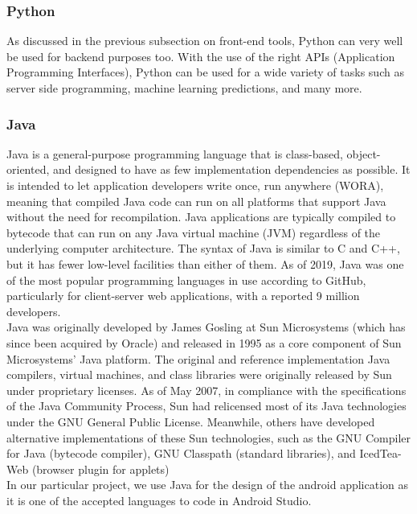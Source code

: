 \documentclass[14pt]{report}
\begin{document}
				\subsubsection{Python}
					As discussed in the previous subsection on front-end tools, Python can very well be used for backend purposes too. With the use of the right APIs (Application Programming Interfaces), Python can be used for a wide variety of tasks such as server side programming, machine learning predictions, and many more.
				
				\subsubsection{Java}
					Java is a general-purpose programming language that is class-based, object-oriented, and designed to have as few implementation dependencies as possible. It is intended to let application developers write once, run anywhere (WORA), meaning that compiled Java code can run on all platforms that support Java without the need for recompilation. Java applications are typically compiled to bytecode that can run on any Java virtual machine (JVM) regardless of the underlying computer architecture. The syntax of Java is similar to C and C++, but it has fewer low-level facilities than either of them. As of 2019, Java was one of the most popular programming languages in use according to GitHub, particularly for client-server web applications, with a reported 9 million developers.\\

					Java was originally developed by James Gosling at Sun Microsystems (which has since been acquired by Oracle) and released in 1995 as a core component of Sun Microsystems' Java platform. The original and reference implementation Java compilers, virtual machines, and class libraries were originally released by Sun under proprietary licenses. As of May 2007, in compliance with the specifications of the Java Community Process, Sun had relicensed most of its Java technologies under the GNU General Public License. Meanwhile, others have developed alternative implementations of these Sun technologies, such as the GNU Compiler for Java (bytecode compiler), GNU Classpath (standard libraries), and IcedTea-Web (browser plugin for applets)\\

					In our particular project, we use Java for the design of the android application as it is one of the accepted languages to code in Android Studio.
	\newpage
\end{document}
